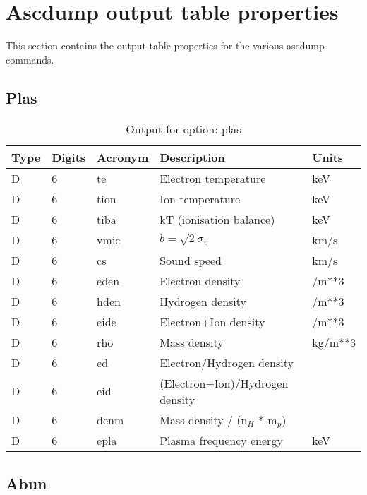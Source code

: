 \section{Ascdump output table properties}

This section contains the output table properties for the various ascdump commands.

\subsection{Plas}

\begin{table}[!p]
\caption{Output for option: plas}
\label{tabout:plas}
\begin{tabular}{lllll}
\hline
Type & Digits & Acronym & Description & Units \\ 
\hline
D &  6 & te   & Electron temperature             & keV              \\
D &  6 & tion & Ion temperature                  & keV              \\
D &  6 & tiba & kT (ionisation balance)          & keV              \\
D &  6 & vmic & $b = \sqrt{2} \sigma_v$          & km/s             \\
D &  6 & cs   & Sound speed                      & km/s             \\
D &  6 & eden & Electron density                 & /m**3            \\
D &  6 & hden & Hydrogen density                 & /m**3            \\
D &  6 & eide & Electron+Ion density             & /m**3            \\
D &  6 & rho  & Mass density                     & kg/m**3          \\
D &  6 & ed   & Electron/Hydrogen density        &                  \\
D &  6 & eid  & (Electron+Ion)/Hydrogen density  &                  \\
D &  6 & denm & Mass density / ($\mathrm{n}_H$ * $\mathrm{m}_p$)   &                  \\
D &  6 & epla & Plasma frequency energy          & keV              \\
\hline
\end{tabular}
\end{table}

\subsection{Abun}

